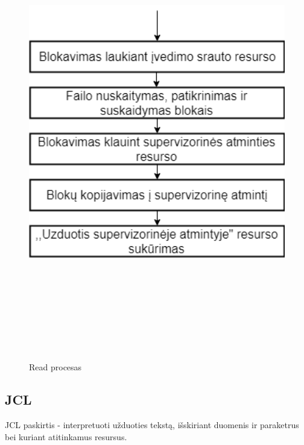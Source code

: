 \documentclass[oneside]{VUMIFPSkursinis}
\begin{document}
\begin{figure}[H]
		\centering	
	\includegraphics[width=18cm,height=20cm,keepaspectratio]{Read.png}
	\caption{Read procesas}
	\label{fig:Read procesas}
\end{figure} 

\subsection{JCL} JCL paskirtis - interpretuoti užduoties tekstą, išskiriant duomenis ir paraketrus bei kuriant atitinkamus resursus.
\end{document}
